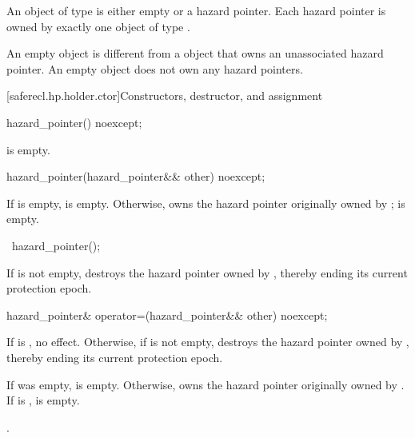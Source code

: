 \pnum
An object of type  is either empty or
 a hazard pointer.
Each hazard pointer is owned by
exactly one object of type .
\begin{note}
An empty  object is different from
a  object
that owns an unassociated hazard pointer.
An empty  object does not own any hazard pointers.
\end{note}

[saferecl.hp.holder.ctor]{Constructors, destructor, and assignment}

%
\begin{itemdecl}
hazard_pointer() noexcept;
\end{itemdecl}

\begin{itemdescr}
\pnum
\ensures
{} is empty.
\end{itemdescr}

%
\begin{itemdecl}
hazard_pointer(hazard_pointer&& other) noexcept;
\end{itemdecl}

\begin{itemdescr}
\pnum
\ensures
If  is empty,  is empty.
Otherwise,
 owns the hazard pointer originally owned by ;
 is empty.
\end{itemdescr}

%
\begin{itemdecl}
~hazard_pointer();
\end{itemdecl}

\begin{itemdescr}
\pnum
\effects
If  is not empty,
destroys the hazard pointer owned by ,
thereby ending its current protection epoch.
\end{itemdescr}

%
\begin{itemdecl}
hazard_pointer& operator=(hazard_pointer&& other) noexcept;
\end{itemdecl}

\begin{itemdescr}
\pnum
\effects
If  is , no effect.
Otherwise, if  is not empty,
destroys the hazard pointer owned by ,
thereby ending its current protection epoch.

\pnum
\ensures
If  was empty,  is empty.
Otherwise,  owns the hazard pointer originally
owned by .
If  is ,  is empty.

\pnum
\returns
{}.
\end{itemdescr}

